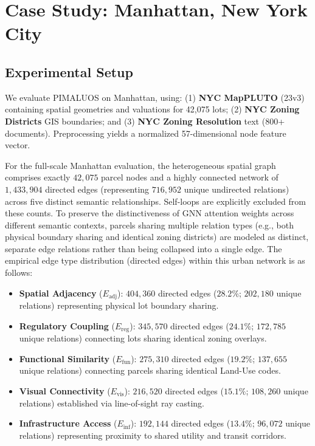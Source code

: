 \documentclass[final,3p,times]{elsarticle}
\begin{document}
\section{Case Study: Manhattan, New York City}

\subsection{Experimental Setup}
We evaluate PIMALUOS on Manhattan, using: (1) \textbf{NYC MapPLUTO} (23v3) containing spatial geometries and valuations for 42,075 lots; (2) \textbf{NYC Zoning Districts} GIS boundaries; and (3) \textbf{NYC Zoning Resolution} text (800+ documents). Preprocessing yields a normalized 57-dimensional node feature vector.

For the full-scale Manhattan evaluation, the heterogeneous spatial graph comprises exactly $42,075$ parcel nodes and a highly connected network of $1,433,904$ directed edges (representing $716,952$ unique undirected relations) across five distinct semantic relationships. Self-loops are explicitly excluded from these counts. To preserve the distinctiveness of GNN attention weights across different semantic contexts, parcels sharing multiple relation types (e.g., both physical boundary sharing and identical zoning districts) are modeled as distinct, separate edge relations rather than being collapsed into a single edge. The empirical edge type distribution (directed edges) within this urban network is as follows:
\begin{itemize}
    \item \textbf{Spatial Adjacency} ($E_{\text{adj}}$): $404,360$ directed edges ($28.2\%$; $202,180$ unique relations) representing physical lot boundary sharing.
    \item \textbf{Regulatory Coupling} ($E_{\text{reg}}$): $345,570$ directed edges ($24.1\%$; $172,785$ unique relations) connecting lots sharing identical zoning overlays.
    \item \textbf{Functional Similarity} ($E_{\text{fun}}$): $275,310$ directed edges ($19.2\%$; $137,655$ unique relations) connecting parcels sharing identical Land-Use codes.
    \item \textbf{Visual Connectivity} ($E_{\text{vis}}$): $216,520$ directed edges ($15.1\%$; $108,260$ unique relations) established via line-of-sight ray casting.
    \item \textbf{Infrastructure Access} ($E_{\text{inf}}$): $192,144$ directed edges ($13.4\%$; $96,072$ unique relations) representing proximity to shared utility and transit corridors.
\end{itemize}
\end{document}
